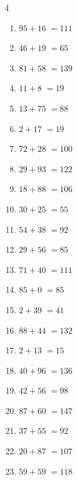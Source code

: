 \begin{multicols}{4}
\begin{enumerate}
  \item $95+16$
        $=111$

  \item $46+19$
        $=65$

  \item $81+58$
        $=139$

  \item $11+8$
        $=19$

  \item $13+75$
        $=88$

  \item $2+17$
        $=19$

  \item $72+28$
        $=100$

\columnbreak %

  \item $29+93$
        $=122$

  \item $18+88$
        $=106$

  \item $30+25$
        $=55$

  \item $54+38$
        $=92$

  \item $29+56$
        $=85$

  \item $71+40$
        $=111$

  \item $85+0$
        $=85$

  \item $2+39$
        $=41$

  \item $88+44$
        $=132$

  \item $2+13$
        $=15$

  \item $40+96$
        $=136$

  \item $42+56$
        $=98$

  \item $87+60$
        $=147$

  \item $37+55$
        $=92$

  \item $20+87$
        $=107$

  \item $59+59$
        $=118$


\end{enumerate}
\end{multicols}
